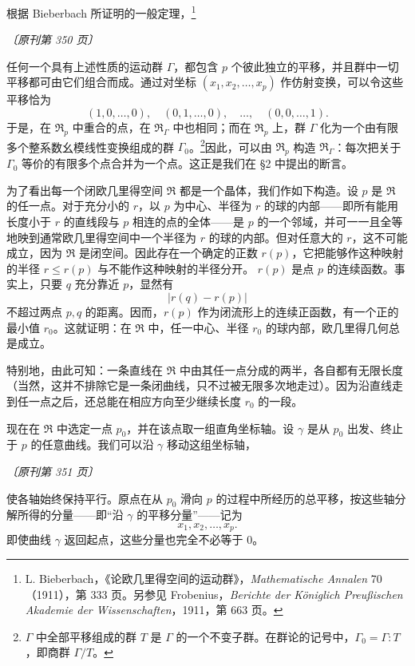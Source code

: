 \documentclass[UTF8,11pt,a4paper,fontset=none]{ctexart}
\theoremstyle{weylthm}
\newcommand{\origpage}[1]{%
  \par\vspace{0.7em}\noindent\hfill{\small\itshape〔原刊第 #1 页〕}\par\vspace{0.25em}}
\begin{document}
根据 Bieberbach 所证明的一般定理，\footnote{L. Bieberbach，《论欧几里得空间的运动群》，\emph{Mathematische Annalen} 70（1911），第 333 页。另参见 Frobenius，\emph{Berichte der Königlich Preußischen Akademie der Wissenschaften}，1911，第 663 页。}

\origpage{350}

任何一个具有上述性质的运动群 \(\Gamma\)，都包含 \(p\) 个彼此独立的平移，并且群中一切平移都可由它们组合而成。通过对坐标
\((x_1,x_2,\ldots,x_p)\) 作仿射变换，可以令这些平移恰为
\[
  (1,0,\ldots,0),\quad(0,1,\ldots,0),\quad\ldots,\quad(0,0,\ldots,1).
\]
于是，在 \(\mathfrak R_p\) 中重合的点，在 \(\mathfrak R_\Gamma\) 中也相同；而在
\(\mathfrak R_p\) 上，群 \(\Gamma\) 化为一个由有限多个整系数幺模线性变换组成的群
\(\Gamma_0\)。\footnote{\(\Gamma\) 中全部平移组成的群 \(T\) 是 \(\Gamma\) 的一个不变子群。在群论的记号中，\(\Gamma_0=\Gamma:T\)，即商群 \(\Gamma/T\)。}因此，可以由 \(\mathfrak R_p\) 构造 \(\mathfrak R_\Gamma\)：每次把关于
\(\Gamma_0\) 等价的有限多个点合并为一个点。这正是我们在 §2 中提出的断言。

为了看出每一个闭欧几里得空间 \(\mathfrak R\) 都是一个晶体，我们作如下构造。设
\(p\) 是 \(\mathfrak R\) 的任一点。对于充分小的 \(r\)，以 \(p\) 为中心、半径为
\(r\) 的球的内部——即所有能用长度小于 \(r\) 的直线段与 \(p\) 相连的点的全体——是
\(p\) 的一个邻域，并可一一且全等地映到通常欧几里得空间中一个半径为
\(r\) 的球的内部。但对任意大的 \(r\)，这不可能成立，因为 \(\mathfrak R\) 是闭空间。因此存在一个确定的正数
\(r(p)\)，它把能够作这种映射的半径 \(r\leq r(p)\) 与不能作这种映射的半径分开。
\(r(p)\) 是点 \(p\) 的连续函数。事实上，只要 \(q\) 充分靠近 \(p\)，显然有
\[
  |r(q)-r(p)|
\]
不超过两点 \(p,q\) 的距离。因而，\(r(p)\) 作为闭流形上的连续正函数，有一个正的最小值
\(r_0\)。这就证明：在 \(\mathfrak R\) 中，任一中心、半径 \(r_0\) 的球内部，欧几里得几何总是成立。

特别地，由此可知：一条直线在 \(\mathfrak R\) 中由其任一点分成的两半，各自都有无限长度（当然，这并不排除它是一条闭曲线，只不过被无限多次地走过）。因为沿直线走到任一点之后，还总能在相应方向至少继续长度
\(r_0\) 的一段。

现在在 \(\mathfrak R\) 中选定一点 \(p_0\)，并在该点取一组直角坐标轴。设
\(\gamma\) 是从 \(p_0\) 出发、终止于 \(p\) 的任意曲线。我们可以沿 \(\gamma\) 移动这组坐标轴，

\origpage{351}

使各轴始终保持平行。原点在从 \(p_0\) 滑向 \(p\) 的过程中所经历的总平移，按这些轴分解所得的分量——即“沿
\(\gamma\) 的平移分量”——记为
\[
  x_1,x_2,\ldots,x_p.
\]
即使曲线 \(\gamma\) 返回起点，这些分量也完全不必等于 \(0\)。
\end{document}

